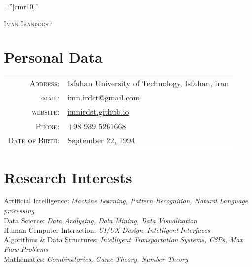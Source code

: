 \documentclass[a4paper,pt]{article}
\begin{document}
	
	
	\pagestyle{empty} %
	
	\font\fb=''[cmr10]'' %
	
	\par{\centering
		{\Huge \textsc{Iman Irandoost}
		}\bigskip\par}
	
	\section{Personal Data}
	\begin{tabular}{rl}
		\textsc{Address:}   & Isfahan University of Technology, Isfahan, Iran \\
		\textsc{email:}     & \href{mailto:imn.irdst@gmail.com}{imn.irdst@gmail.com}\\
		\textsc{website:}     & \href{https://imnirdst.github.io/}{imnirdst.github.io}\\
		\textsc{Phone:}     & +98 939 5261668\\
		\textsc{Date of Birth:} & September 22, 1994
	\end{tabular}
	
	\section{Research Interests}
		\textbullet\textnormal{ Artificial Intelligence:}  \emph{\color{darkgray}\small Machine Learning, Pattern Recognition, Natural Language processing} \vspace{2 mm}  \\
		\textbullet\textnormal{ Data Science:} \emph{\color{darkgray}\small Data Analysing, Data Mining, Data Visualization} \vspace{2 mm} \\
		\textbullet\textnormal{ Human Computer Interaction:} \emph{\color{darkgray}\small UI/UX Design, Intelligent Interfaces} \vspace{2 mm} \\
		\textbullet\textnormal{ Algorithms \& Data Structures:} \emph{\color{darkgray}\small Intelligent Transportation Systems, CSPs, Max Flow Problems} \vspace{2 mm} \\
		\textbullet\textnormal{ Mathematics:} \emph{\color{darkgray}\small Combinatorics, Game Theory, Number Theory}
\end{document}
